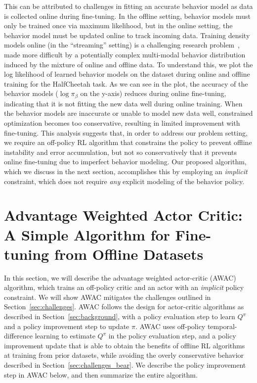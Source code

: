This can be attributed to challenges in fitting an accurate behavior model as data is collected online during fine-tuning. In the offline setting, behavior models must only be trained once via maximum likelihood, but in the online setting, the behavior model must be updated online to track incoming data. Training density models online (in the ``streaming'' setting) is a challenging research problem~\citep{ramapuram2017lifelonggm}, made more difficult by a potentially complex multi-modal behavior distribution induced by the mixture of online and offline data. To understand this, we plot the log likelihood of learned behavior models on the dataset during online and offline training for the HalfCheetah task. As we can see in the plot, the accuracy of the behavior models ($\log \pi_\beta$ on the y-axis) reduces during online fine-tuning, indicating that it is not fitting the new data well during online training. When the behavior models are inaccurate or unable to model new data well, constrained optimization becomes too conservative, resulting in limited improvement with fine-tuning. This analysis suggests that, in order to address our problem setting, we require an off-policy RL algorithm that constrains the policy to prevent offline instability and error accumulation, but not so conservatively that it prevents online fine-tuning due to imperfect behavior modeling. Our proposed algorithm, which we discuss in the next section, accomplishes this by employing an \emph{implicit} constraint, which does not require \emph{any} explicit modeling of the behavior policy.

\section{Advantage Weighted Actor Critic: A Simple Algorithm for Fine-tuning from Offline Datasets}
\label{sec:method}

In this section, we will describe the advantage weighted actor-critic (AWAC) algorithm, which trains an off-policy critic and an actor with an \emph{implicit} policy constraint. We will show AWAC mitigates the challenges outlined in Section~\ref{sec:challenges}. AWAC follows the design for actor-critic algorithms as described in Section~\ref{sec:background}, with a policy evaluation step to learn $Q^\pi$ and a policy improvement step to update $\pi$. AWAC uses off-policy temporal-difference learning to estimate $Q^\pi$ in the policy evaluation step, and a policy improvement update that is able to obtain the benefits of offline RL algorithms at training from prior datasets, while avoiding the overly conservative behavior described in Section~\ref{sec:challenges_bear}. We describe the policy improvement step in AWAC below, and then summarize the entire algorithm. 

